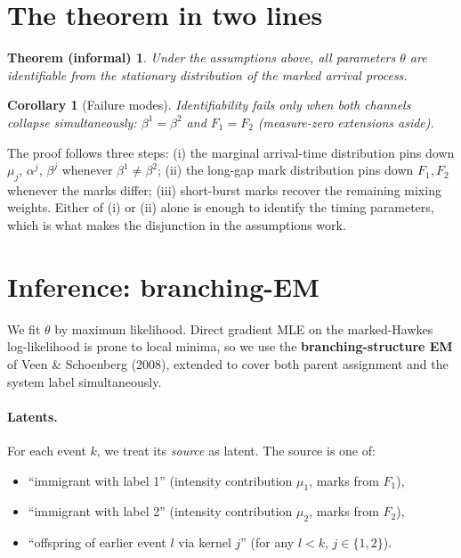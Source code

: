\documentclass[11pt]{article}
\newtheorem*{theoremstar}{Theorem (informal)}
\newtheorem*{corollarystar}{Corollary}
\begin{document}
\section{The theorem in two lines}

\begin{theoremstar}
Under the assumptions above, all parameters $\theta$ are identifiable from the stationary distribution of the marked arrival process.
\end{theoremstar}

\begin{corollarystar}[Failure modes]
Identifiability fails only when \emph{both} channels collapse simultaneously: $\beta^1 = \beta^2$ and $F_1 = F_2$ (measure-zero extensions aside).
\end{corollarystar}

The proof follows three steps: (i) the marginal arrival-time distribution pins down $\mu_j$, $\alpha^j$, $\beta^j$ whenever $\beta^1 \neq \beta^2$; (ii) the long-gap mark distribution pins down $F_1, F_2$ whenever the marks differ; (iii) short-burst marks recover the remaining mixing weights. Either of (i) or (ii) alone is enough to identify the timing parameters, which is what makes the disjunction in the assumptions work.

\section{Inference: branching-EM}
\label{sec:inference}

We fit $\theta$ by maximum likelihood. Direct gradient MLE on the marked-Hawkes log-likelihood is prone to local minima, so we use the \textbf{branching-structure EM} of Veen \& Schoenberg (2008), extended to cover both parent assignment and the system label simultaneously.

\paragraph{Latents.} For each event $k$, we treat its \emph{source} as latent. The source is one of:
\begin{itemize}[leftmargin=*,nosep]
\item ``immigrant with label 1'' (intensity contribution $\mu_1$, marks from $F_1$),
\item ``immigrant with label 2'' (intensity contribution $\mu_2$, marks from $F_2$),
\item ``offspring of earlier event $l$ via kernel $j$'' (for any $l < k$, $j \in \{1, 2\}$).
\end{itemize}
\end{document}
